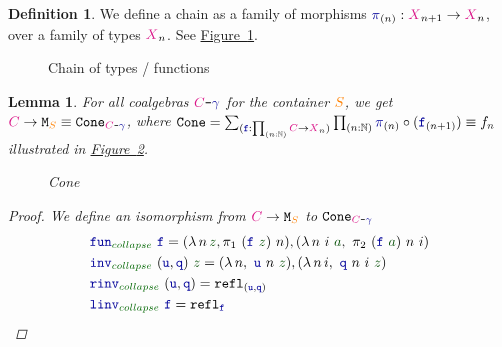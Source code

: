 \documentclass[twoside,11pt,openright]{report}
\theoremstyle{plain} %
\newtheorem{lem}[thm]{Lemma}
\theoremstyle{definition}
\newtheorem{defn}[thm]{Definition}%
\theoremstyle{remark}
\newcommand*{\figref}[1]{\hyperref[fig:#1]{Figure~\ref*{fig:#1}}}
\newcommand*{\term}[1]{\textcolor{green!30!black}{#1}} %
\newcommand*{\pathterm}[1]{\textcolor{green!40!black}{#1}}
\newcommand*{\type}[1]{\textcolor{magenta!90!black}{#1}}
\newcommand*{\container}[1]{\textcolor{orange}{#1}}
\newcommand*{\coalg}[2]{#1\texttt{-}#2}
\newcommand*{\function}[1]{\textcolor{blue!60!black}{\ensuremath{\mathtt{#1}}}}
\newcommand*{\typeformer}[1]{\ensuremath{\mathtt{#1}}}
\begin{document}
\begin{defn}
  We define a chain as a family of morphisms \(\function{\pi}_{(n)} : \type{X}_{n+1} \rightarrow \type{X}_{n}\), over a family of types \(\type{X}_{n}\). See \figref{x-chain}.
  \begin{figure}[h]
    \centering
    \caption{Chain of types / functions}
    \label{fig:x-chain}
  \end{figure}  
\end{defn}
\begin{lem}\label{lem:function-to-M-type-is-cone}
  For all coalgebras \(\coalg{\type{C}}{\function{\gamma}}\) for the container \(\container{S}\), we get \(\type{C} \rightarrow \typeformer{M}_{\container{S}} \equiv \typeformer{Cone}_{\coalg{\type{C}}{\function{\gamma}}}\), where \(\typeformer{Cone} = \sum_{(\function{f} : \prod_{(n : \mathbb{N})} \type{C} \rightarrow \type{X}_n)} \prod_{(n : \mathbb{N})} \function{\pi}_{(n)} \circ (\function{f}_{(n+1)}) \equiv f_n\) illustrated in \figref{M-seq-cone}.
  \begin{figure}[h]
    \centering
    \caption{Cone}
    \label{fig:M-seq-cone}
  \end{figure}  
  \begin{proof}
    We define an isomorphism from \(\type{C} \rightarrow \typeformer{M}_{\container{S}}\) to \(\typeformer{Cone}_{\coalg{\type{C}}{\function{\gamma}}}\)
    \begin{align}
      &\function{fun}_{\pathterm{collapse}}~\function{f} = (\lambda\,n\,\term{z},\pi_1~(\function{f}~\term{z})~n),(\lambda\,n~i~\term{a},~\pi_2~(\function{f}~\term{a})~n~i) \\
      &\function{inv}_{\pathterm{collapse}}~(\function{u},\function{q})~\term{z} = (\lambda\,n,~\function{u}~n~\term{z}),(\lambda\,n\,i,~\function{q}~n~i~\term{z}) \\
      &\function{rinv}_{\pathterm{collapse}}~(\function{u},\function{q}) = \mathtt{refl}_{(\function{u},\function{q})} \\
      &\function{linv}_{\pathterm{collapse}}~\function{f} = \mathtt{refl}_{\function{f}}
    \end{align}
  \end{proof}
\end{lem}
\end{document}
